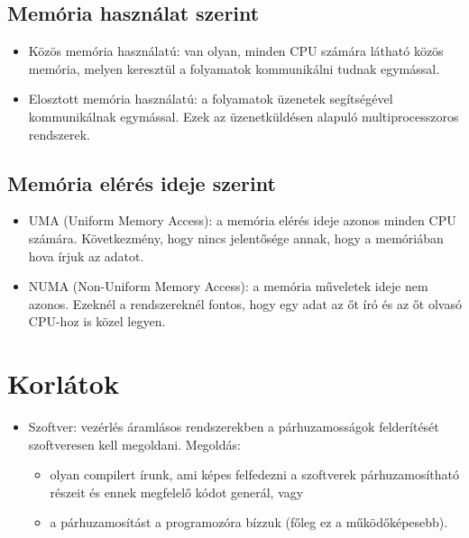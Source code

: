 \subsection{Memória használat szerint}
\begin{itemize}
    \item Közös memória használatú: van olyan, minden CPU számára látható közös memória, melyen keresztül a folyamatok kommunikálni tudnak egymással.
    \item Elosztott memória használatú: a folyamatok üzenetek segítségével kommunikálnak egymással. Ezek az üzenetküldésen alapuló multiprocesszoros rendszerek.
\end{itemize}
\subsection{Memória elérés ideje szerint}
\begin{itemize}
    \item UMA (Uniform Memory Access): a memória elérés ideje azonos minden CPU számára. Következmény, hogy nincs jelentősége annak, hogy a memóriában hova írjuk az adatot.
    \item NUMA (Non-Uniform Memory Access): a memória műveletek ideje nem azonos. Ezeknél a rendszereknél fontos, hogy egy adat az őt író és az őt olvasó CPU-hoz is közel legyen.
\end{itemize}

\section{Korlátok}
\begin{itemize}
    \item Szoftver: vezérlés áramlásos rendszerekben a párhuzamosságok felderítését szoftveresen kell megoldani. Megoldás:
    \begin{itemize}
        \item olyan compilert írunk, ami képes felfedezni a szoftverek párhuzamosítható részeit és ennek megfelelő kódot generál, vagy
        \item a párhuzamosítást a programozóra bízzuk (főleg ez a működőképesebb).
    \end{itemize}
\end{itemize}

